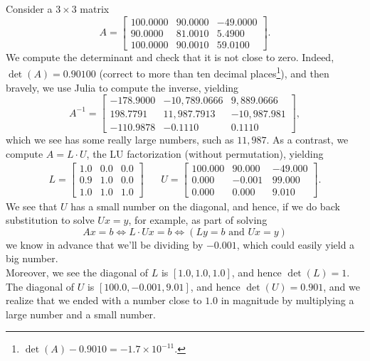 \begin{example}   Consider a $3 \times 3$ matrix
\begin{equation}
\label{eq:poorlyCondtionedA}
    A=\left[ \begin{array}{ccr} 
       100.0000 &  90.0000 & -49.0000 \\
   90.0000 &  81.0010 &  5.4900 \\
   100.0000 &   90.0010 &   59.0100  \end{array} \right].
\end{equation}
We compute the determinant and check that it is not close to zero. Indeed, $\det(A)=0.90100$ (correct to more than ten decimal places\footnote{$\det(A)-0.9010=-1.7 \times 10^{-11}$.}), and then bravely, we use Julia to compute the inverse, yielding
$$A^{-1} =  \left[\begin{array}{rrr} 
  -178.9000 & -10,789.0666  & 9,889.0666 \\
   198.7791 &   11,987.7913 &  -10,987.981 \\
  -110.9878 &  -0.1110 &    0.1110
  \end{array} \right], $$
which we see has some really large numbers, such as $ 11,987$. As a contrast, we compute $A=L \cdot U$, the LU factorization (without permutation), yielding
\begin{equation*}
\begin{array}{cc} 
    L=\left[ \begin{array}{ccr} 
1.0 &     0.0 &  0.0 \\
 0.9 &    1.0  & 0.0 \\
 1.0 &   1.0 &  1.0  \end{array} \right] & ~~~~
 U= \left[ \begin{array}{rrr} 
  100.000 &  90.000~~     &     -49.000 \\
 0.000   &  \boxed{ -0.001} &  99.000 \\
 0.000   &    0.000~~   &     9.010  \end{array} \right].
 \end{array}
\end{equation*}
We see that $U$ has a small number on the diagonal, and hence, if we do back substitution to solve $Ux=y$, for example, as part of solving
$$Ax = b \iff L\cdot U x = b \iff (Ly =b \text{ and } Ux=y )$$ 
we know in advance that we'll be dividing by $-0.001$, which could easily yield a big number. \\

Moreover, we see the diagonal of $L$ is $[1.0, 1.0, 1.0]$, and hence $\det(L)=1$. The diagonal of $U$ is $[100.0, -0.001, 9.01]$, and hence $\det(U)=0.901$, and we realize that we ended with a number close to $1.0$ in magnitude by multiplying a large number and a small number. \Qed
\end{example}




